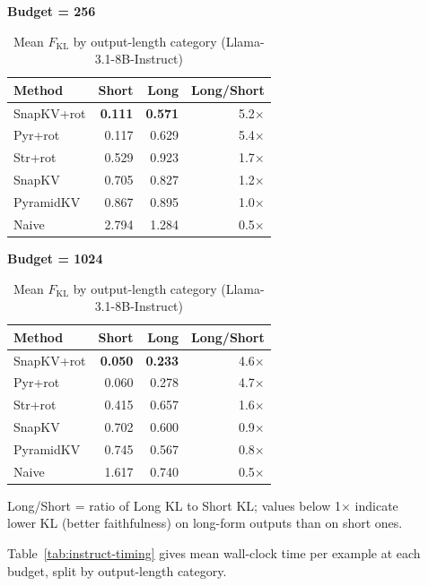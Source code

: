 \documentclass[10pt,letterpaper]{article}
\begin{document}
\begin{table}[H]
\centering
\small
\caption{Mean \(F_{\text{KL}}\) by output-length category (Llama-3.1-8B-Instruct)}
\label{tab:instruct-kl-shortlong}
\begin{minipage}[t]{0.47\textwidth}
\centering
\textbf{Budget = 256}\\[4pt]
\begin{tabular}{@{}lrrr@{}}
\toprule
Method & Short & Long & Long/Short\\
\midrule
SnapKV+rot & \textbf{0.111} & \textbf{0.571} & 5.2$\times$\\
Pyr+rot    & 0.117 & 0.629 & 5.4$\times$\\
Str+rot   & 0.529 & 0.923 & 1.7$\times$\\
SnapKV     & 0.705 & 0.827 & 1.2$\times$\\
PyramidKV  & 0.867 & 0.895 & 1.0$\times$\\
Naive      & 2.794 & 1.284 & 0.5$\times$\\
\bottomrule
\end{tabular}
\end{minipage}
\hfill
\begin{minipage}[t]{0.47\textwidth}
\centering
\textbf{Budget = 1024}\\[4pt]
\begin{tabular}{@{}lrrr@{}}
\toprule
Method & Short & Long & Long/Short\\
\midrule
SnapKV+rot & \textbf{0.050} & \textbf{0.233} & 4.6$\times$\\
Pyr+rot    & 0.060 & 0.278 & 4.7$\times$\\
Str+rot   & 0.415 & 0.657 & 1.6$\times$\\
SnapKV     & 0.702 & 0.600 & 0.9$\times$\\
PyramidKV  & 0.745 & 0.567 & 0.8$\times$\\
Naive      & 1.617 & 0.740 & 0.5$\times$\\
\bottomrule
\end{tabular}
\end{minipage}

\medskip
Long/Short = ratio of Long KL to Short KL; values below 1$\times$ indicate
\\lower KL (better faithfulness) on long-form outputs than on short ones.
\end{table}

Table~\ref{tab:instruct-timing} gives mean wall-clock time per example at each
budget, split by output-length category.
\end{document}
